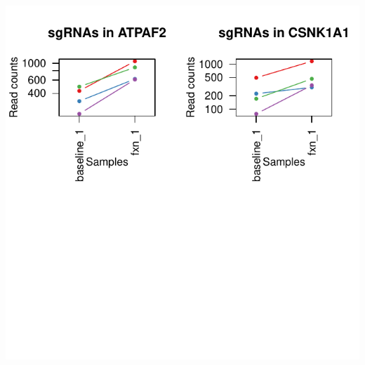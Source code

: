 \documentclass{article}
\begin{document}
\includegraphics{defaultTest_defaultNormCount_screen1_summary-012}
\end{document}
